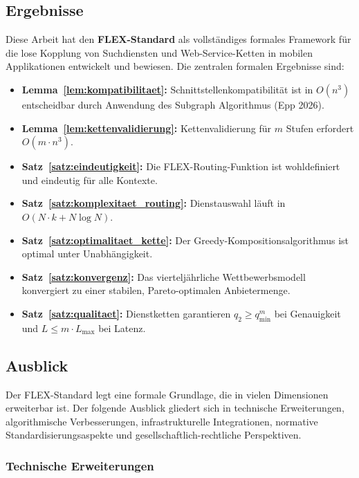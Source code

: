 ﻿\documentclass[a4paper,12pt]{article}
\theoremstyle{definition}
\begin{document}
\subsection{Ergebnisse}

Diese Arbeit hat den \textbf{FLEX-Standard} als vollständiges formales Framework für die lose Kopplung von Suchdiensten und Web-Service-Ketten in mobilen Applikationen entwickelt und bewiesen. Die zentralen formalen Ergebnisse sind:

\begin{itemize}
    \item \textbf{Lemma~\ref{lem:kompatibilitaet}:} Schnittstellenkompatibilität ist in $O(n^3)$ entscheidbar durch Anwendung des Subgraph Algorithmus (Epp 2026).
    \item \textbf{Lemma~\ref{lem:kettenvalidierung}:} Kettenvalidierung für $m$ Stufen erfordert $O(m \cdot n^3)$.
    \item \textbf{Satz~\ref{satz:eindeutigkeit}:} Die FLEX-Routing-Funktion ist wohldefiniert und eindeutig für alle Kontexte.
    \item \textbf{Satz~\ref{satz:komplexitaet_routing}:} Dienstauswahl läuft in $O(N \cdot k + N \log N)$.
    \item \textbf{Satz~\ref{satz:optimalitaet_kette}:} Der Greedy-Kompositionsalgorithmus ist optimal unter Unabhängigkeit.
    \item \textbf{Satz~\ref{satz:konvergenz}:} Das vierteljährliche Wettbewerbsmodell konvergiert zu einer stabilen, Pareto-optimalen Anbietermenge.
    \item \textbf{Satz~\ref{satz:qualitaet}:} Dienstketten garantieren $q_2 \geq q_\mathrm{min}^m$ bei Genauigkeit und $L \leq m \cdot L_\mathrm{max}$ bei Latenz.
\end{itemize}

\subsection{Ausblick}
\label{sec:ausblick}

Der FLEX-Standard legt eine formale Grundlage, die in vielen Dimensionen erweiterbar ist. Der folgende Ausblick gliedert sich in technische Erweiterungen, algorithmische Verbesserungen, infrastrukturelle Integrationen, normative Standardisierungsaspekte und gesellschaftlich-rechtliche Perspektiven.

\subsubsection{Technische Erweiterungen}
\end{document}
